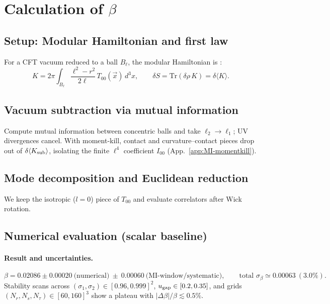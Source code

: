 \documentclass[aps,prd,onecolumn,superscriptaddress,nofootinbib]{revtex4-2}
\begin{document}
\section{Calculation of \texorpdfstring{$\beta$}{beta}}
\label{sec:beta-calc}

\subsection{Setup: Modular Hamiltonian and first law}
For a CFT vacuum reduced to a ball $B_\ell$, the modular Hamiltonian is \cite{Casini2011}:
\begin{equation}
K = 2\pi \int_{B_\ell} \frac{\ell^2 - r^2}{2\ell}\, T_{00}(\vec{x})\, d^3x,
\qquad
\delta S = \mathrm{Tr}(\delta\rho\, K) = \delta \langle K \rangle.
\end{equation}

\subsection{Vacuum subtraction via mutual information}
Compute mutual information between concentric balls and take $\ell_2\to\ell_1$; UV divergences cancel. With moment-kill, contact and curvature--contact pieces drop out of $\delta\langle K_{\rm sub}\rangle$, isolating the finite $\ell^4$ coefficient $I_{00}$ (App.~\ref{app:MI-momentkill}).

\subsection{Mode decomposition and Euclidean reduction}
We keep the isotropic ($l=0$) piece of $T_{00}$ and evaluate correlators after Wick rotation.

\subsection{Numerical evaluation (scalar baseline)}
\paragraph*{Result and uncertainties.}
\begin{equation}
\beta = 0.02086 \pm 0.00020\ \text{(numerical)} \ \pm\ 0.00060\ \text{(MI-window/systematic)},\qquad \text{total }\sigma_\beta \simeq 0.00063~(3.0\%).
\end{equation}
Stability scans across $(\sigma_1,\sigma_2)\in[0.96,0.999]^2$, $u_{\rm gap}\in[0.2,0.35]$, and grids $(N_r,N_s,N_\tau)\in[60,160]^3$ show a plateau with $|\Delta\beta|/\beta \lesssim 0.5\%$.
\end{document}
